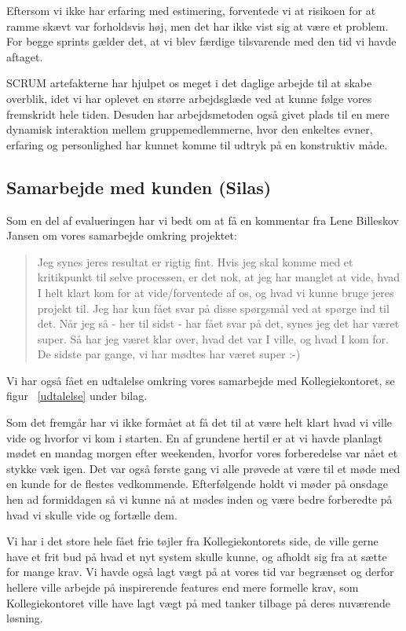 \documentclass[12pt, a4paper]{report}
\begin{document}
Eftersom vi ikke har erfaring med estimering, forventede vi at risikoen for at ramme skævt var forholdsvis høj, men det har ikke vist sig at være et problem. For begge sprints gælder det, at vi blev færdige tilsvarende med den tid vi havde aftaget.

SCRUM artefakterne har hjulpet os meget i det daglige arbejde til at skabe overblik, idet vi har oplevet en større arbejdsglæde ved at kunne følge vores fremskridt hele tiden.
Desuden har arbejdsmetoden også givet plads til en mere dynamisk interaktion mellem gruppemedlemmerne, hvor den enkeltes evner, erfaring og personlighed har kunnet komme til udtryk på en konstruktiv måde.

\subsection{Samarbejde med kunden (Silas)}
Som en del af evalueringen har vi bedt om at få en kommentar fra Lene Billeskov Jansen om vores samarbejde omkring projektet:
\begin{quote}
Jeg synes jeres resultat er rigtig fint. Hvis jeg skal komme med et kritikpunkt til selve processen, er det nok, at jeg har manglet at vide, hvad I helt klart kom for at vide/forventede af os, og hvad vi kunne bruge jeres projekt til. Jeg har kun fået svar på disse spørgsmål ved at spørge ind til det. Når jeg så - her til sidst - har fået svar på det, synes jeg det har været super. Så har jeg været klar over, hvad det var I ville, og hvad I kom for. De sidste par gange, vi har mødtes har været super :-)
\end{quote}
Vi har også fået en udtalelse omkring vores samarbejde med Kollegiekontoret, se figur ~\ref{udtalelse} under bilag.

Som det fremgår har vi ikke formået at få det til at være helt klart hvad vi ville vide og hvorfor vi kom i starten. En af grundene hertil er at vi havde planlagt mødet en mandag morgen efter weekenden, hvorfor vores forberedelse var nået et stykke væk igen. Det var også første gang vi alle prøvede at være til et møde med en kunde for de flestes vedkommende. Efterfølgende holdt vi møder på onsdage hen ad formiddagen så vi kunne nå at mødes inden og være bedre forberedte på hvad vi skulle vide og fortælle dem.

Vi har i det store hele fået frie tøjler fra Kollegiekontorets side, de ville gerne have et frit bud på hvad et nyt system skulle kunne, og afholdt sig fra at sætte for mange krav. Vi havde også lagt vægt på at vores tid var begrænset og derfor hellere ville arbejde på inspirerende features end mere formelle krav, som Kollegiekontoret ville have lagt vægt på med tanker tilbage på deres nuværende løsning.
\end{document}
